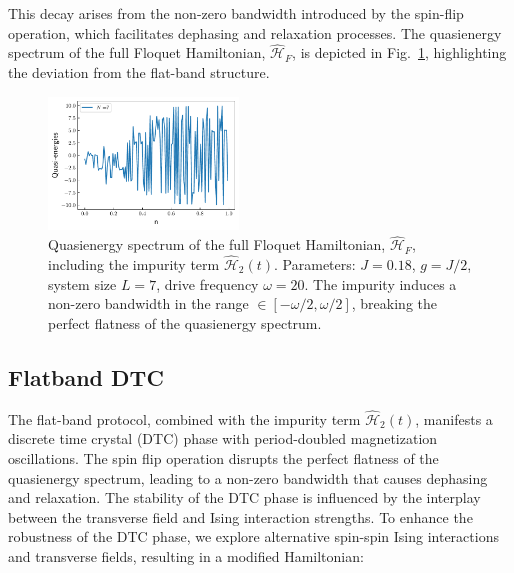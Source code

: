 \documentclass[a4paper,10pt]{article}
\begin{document}
This decay arises from the non-zero bandwidth introduced by the spin-flip operation, which facilitates dephasing and relaxation processes. The quasienergy spectrum of the full Floquet Hamiltonian, $\hat{\mathcal{H}}_F$, is depicted in Fig.~\ref{figs:impure_flatband_qe}, highlighting the deviation from the flat-band structure.
\begin{figure}[h!]
    \centering
    \includegraphics[width=0.45\textwidth]{figs/impure_flatband_qe.pdf}
    \caption{Quasienergy spectrum of the full Floquet Hamiltonian, $\hat{\mathcal{H}}_F$, including the impurity term $\hat{\mathcal{H}}_2(t)$. Parameters: $J=0.18$, $g=J/2$, system size $L=7$, drive frequency $\omega=20$. The impurity induces a non-zero bandwidth in the range $\in[-\omega/2 , \omega/2]$, breaking the perfect flatness of the quasienergy spectrum.}
    \label{figs:impure_flatband_qe}
\end{figure}

\subsection{Flatband DTC}
The flat-band protocol, combined with the impurity term $\hat{\mathcal{H}}_2(t)$, manifests a discrete time crystal (DTC) phase with period-doubled magnetization oscillations. The spin flip operation disrupts the perfect flatness of the quasienergy spectrum, leading to a non-zero bandwidth that causes dephasing and relaxation. The stability of the DTC phase is influenced by the interplay between the transverse field and Ising interaction strengths. To enhance the robustness of the DTC phase, we explore alternative spin-spin Ising interactions and transverse fields, resulting in a modified Hamiltonian:
\end{document}
